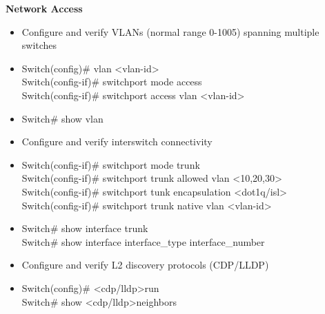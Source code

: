 \documentclass{article}
\begin{document}
\begin{flushleft}\textbf{Network Access}\end{flushleft}
\begin{itemize}
  \item Configure and verify VLANs (normal range 0-1005) spanning multiple switches
	\item[] 
		Switch(config)\# vlan \textless vlan-id\textgreater\\
		Switch(config-if)\# switchport mode access\\
		Switch(config-if)\# switchport access vlan \textless vlan-id\textgreater
  	\item[] 
  		Switch\# show vlan\\
  	
  \item Configure and verify interswitch connectivity
  	\item[] 
  		Switch(config-if)\# switchport mode trunk\\
  		Switch(config-if)\# switchport trunk allowed vlan \textless 10,20,30\textgreater\\
  		Switch(config-if)\# switchport tunk encapsulation \textless dot1q/isl\textgreater\\
  		Switch(config-if)\# switchport trunk native vlan \textless vlan-id\textgreater
  	\item[] 
  		Switch\# show interface trunk\\
  		Switch\# show interface interface\_type interface\_number\\
  		
  \item Configure and verify L2 discovery protocols (CDP/LLDP)
  	\item[] 
  		Switch(config)\# \textless cdp/lldp\textgreater run\\
  		Switch\# show \textless cdp/lldp\textgreater neighbors\\
  		

\end{itemize}
\end{document}
